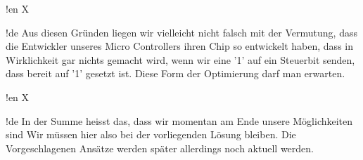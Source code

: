 !en X

!de Aus diesen Gründen liegen wir vielleicht nicht falsch mit der Vermutung, dass die Entwickler unseres Micro Controllers ihren Chip so entwickelt haben, dass in Wirklichkeit gar nichts gemacht wird, wenn wir eine '1' auf ein Steuerbit senden, dass bereit auf '1' gesetzt ist. Diese Form der Optimierung darf man erwarten.



!en X

!de In der Summe heisst das, dass wir momentan am Ende unsere Möglichkeiten sind Wir müssen hier also bei der vorliegenden Lösung bleiben. Die Vorgeschlagenen Ansätze werden später allerdings noch aktuell werden.